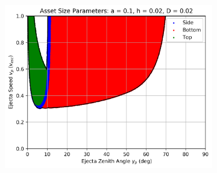 \documentclass{article}
\begin{document}
\begin{figure}
	\begin{subfigure}[t]{.32\textwidth}
		\centering
		\includegraphics[width=.98\linewidth]{asset_speed_zenith_plot_1.100e+00_1.000e-01_2.000e-02_2.000e-02.png}  
		\label{fig:sub-asset_speed_zenith_h2_6}
	\end{subfigure}
	

\end{figure}
\end{document}
